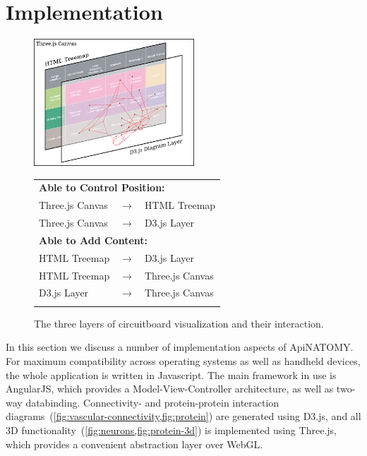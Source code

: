 \section{Implementation} \label{sect:implementation}                                     %

\begin{figure}[ht]
	\centering
	\includegraphics[width=6cm]{images/visual-layers.png}
	\hskip1mm
	\begin{tabular}[b]{lcl}
		\multicolumn{3}{l}{\textbf{Able to Control Position:}}     \\[1mm]
		Three.js Canvas     & $\longrightarrow$ & HTML Treemap     \\[1mm]
		Three.js Canvas     & $\longrightarrow$ & D3.js Layer      \\[3mm]
		
		\multicolumn{3}{l}{\textbf{Able to Add Content:}}          \\[1mm]
		HTML Treemap        & $\longrightarrow$ & D3.js Layer      \\[1mm]
		HTML Treemap        & $\longrightarrow$ & Three.js Canvas  \\[1mm]
		D3.js Layer         & $\longrightarrow$ & Three.js Canvas  \\[3mm]\vphantom{x}%
	\end{tabular}
	\vskip1mm
	\caption{The three layers of circuitboard visualization and their interaction.}
	\label{fig:visual-layers}
\end{figure}

In this section we discuss a number of implementation aspects of \mbox{ApiNATOMY}.
For maximum compatibility across operating systems as well as handheld devices,
the whole application is written in Javascript. The main framework in use is
AngularJS, which provides a Model-View-Controller architecture, as well as
two-way databinding. Connectivity- and protein-protein
interaction diagrams~(\cref{fig:vascular-connectivity,fig:protein})
are generated using D3.js, and all 3D functionality~(\cref{fig:neurons,fig:protein-3d})
is implemented using Three.js, which provides a convenient abstraction layer over WebGL.



